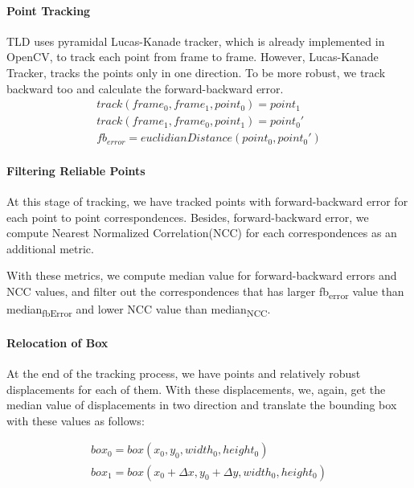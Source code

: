 \documentclass{report}
\begin{document}
        \paragraph{Point Tracking}
            TLD uses pyramidal Lucas-Kanade tracker, which is already implemented in OpenCV, to track each point from frame
            to frame. However, Lucas-Kanade Tracker, tracks the points only in one direction. To be more robust,
            we track backward too and calculate the forward-backward error.
            \begin{gather}
                track(frame_{0}, frame_{1}, point_{0}) = point_{1} \\
                track(frame_{1}, frame_{0}, point_{1}) = point_{0}' \\
                fb_{error} = euclidianDistance(point_{0}, point_{0}')
            \end{gather}
        \paragraph{Filtering Reliable Points}
            At this stage of tracking, we have tracked points with forward-backward error
            for each point to point correspondences. Besides, forward-backward error, we compute
            Nearest Normalized Correlation(NCC) for each correspondences as an additional metric.

            With these metrics, we compute median value for forward-backward errors and NCC values, and filter out
            the correspondences that has larger fb\textsubscript{error} value than median\textsubscript{fbError} and
            lower NCC value than median\textsubscript{NCC}.

        \paragraph{Relocation of Box}
            At the end of the tracking process, we have points and relatively robust displacements for each of them.
            With these displacements, we, again, get the median value of displacements in two direction and translate
            the bounding box with these values as follows:

            \begin{gather}
                box_{0} = box(x_{0}, y_{0}, width_{0}, height_{0}) \\
                box_{1} = box(x_{0} + \Delta x, y_{0} + \Delta y, width_{0}, height_{0})
            \end{gather}
\end{document}
